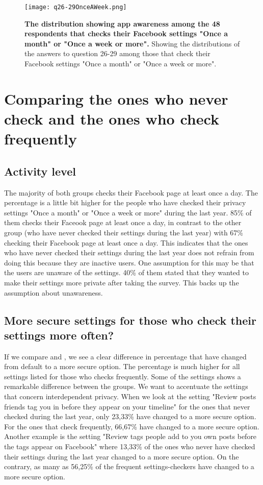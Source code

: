 \begin{figure}[h!]
\centering
\texttt{[image: q26-29OnceAWeek.png]}
\caption[The distribution showing app awareness among the 48 respondents that checks their Facebook settings "Once a month" or "Once a week or more"]{\textbf{The distribution showing app awareness among the 48 respondents that checks their Facebook settings "Once a month" or "Once a week or more".} Showing the distributions of the answers to question 26-29 among those that check their Facebook settings "Once a month" or "Once a week or more".} 
\label{fig:appawarenessonceaweek}
\end{figure}


\section{Comparing the ones who never check and the ones who check frequently} 

\subsection{Activity level}
The majority of both groups checks their Facebook page at least once a day. The percentage is a little bit higher for the people who have checked their privacy settings "Once a month" or "Once a week or more" during the last year. 85\% of them checks their Faceook page at least once a day, in contrast to the other group (who have never checked their settings during the last year) with 67\% checking their Facebook page at least once a day. This indicates that the ones who have never checked their settings during the last year does not refrain from doing this because they are inactive users. One assumption for this may be that the users are unaware of the settings. 40\% of them stated that they wanted to make their settings more private after taking the survey. This backs up the assumption about unawareness.  


\subsection{More secure settings for those who check their settings more often?}
If we compare  and , we see a clear difference in percentage that have changed from default to a more secure option. The percentage is much higher for all settings listed for those who checks frequently. Some of the settings shows a remarkable difference between the groups. We want to accentuate the settings that concern interdependent privacy. When we look at the setting "Review posts friends tag you in before they appear on your timeline" for the ones that never checked during the last year, only 23,33\% have changed to a more secure option. For the ones that check frequently, 66,67\% have changed to a more secure option. Another example is the setting "Review tags people add to you own posts before the tags appear on Facebook" where 13,33\% of the ones who never have checked their settings during the last year changed to a more secure option. On the contrary, as many as 56,25\% of the frequent settings-checkers have changed to a more secure option.

